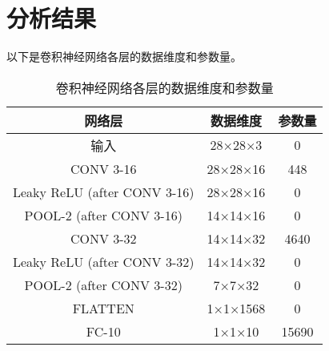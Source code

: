 \section{分析结果}\label{sec:results}

以下是卷积神经网络各层的数据维度和参数量。

\begin{table}[!hpt]
  \caption{卷积神经网络各层的数据维度和参数量}
  \centering
  \begin{tabular}{ccc} \toprule
    \textbf{网络层} & \textbf{数据维度} & \textbf{参数量} \\ \midrule
    输入 & 28×28×3 & 0 \\
    CONV 3-16 & 28×28×16 & 448 \\
    Leaky ReLU (after CONV 3-16) & 28×28×16 & 0 \\
    POOL-2 (after CONV 3-16) & 14×14×16 & 0 \\
    CONV 3-32 & 14×14×32 & 4640 \\
    Leaky ReLU (after CONV 3-32) & 14×14×32 & 0 \\
    POOL-2 (after CONV 3-32) & 7×7×32 & 0 \\
    FLATTEN & 1×1×1568 & 0 \\
    FC-10 & 1×1×10 & 15690 \\ \bottomrule
  \end{tabular}
\end{table}